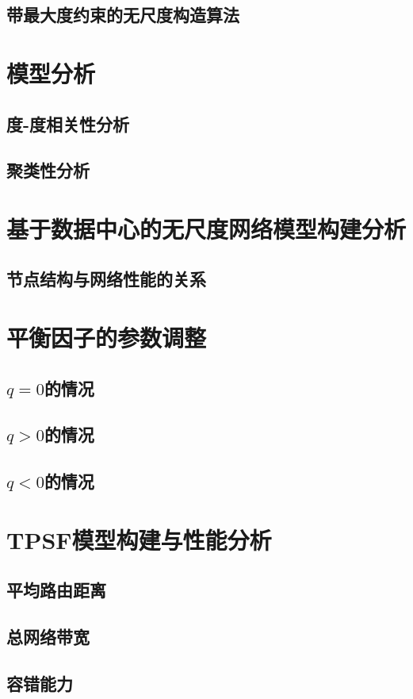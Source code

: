 \documentclass[master]{njuthesis}
\begin{document}
\subsection{带最大度约束的无尺度构造算法}
\Blindtext
\section{模型分析}
\subsection{度-度相关性分析}
\Blindtext
\subsection{聚类性分析}
\Blindtext
\section{基于数据中心的无尺度网络模型构建分析}
\blindtext
\subsection{节点结构与网络性能的关系}
\Blindtext
\section{平衡因子的参数调整}
\blindtext
\subsection{$q=0$的情况}
\Blindtext
\subsection{$q>0$的情况}
\Blindtext
\subsection{$q<0$的情况}
\Blindtext
\section{TPSF模型构建与性能分析}
\blindtext
\subsection{平均路由距离}
\Blindtext
\subsection{总网络带宽}
\Blindtext
\subsection{容错能力}
\Blindtext
\end{document}
